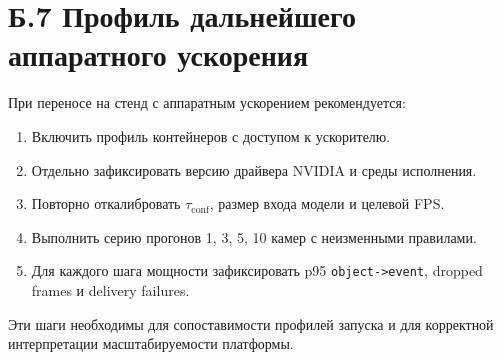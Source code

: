 \section*{Б.7 Профиль дальнейшего аппаратного ускорения}
{}

При переносе на стенд с аппаратным ускорением рекомендуется:
\begin{enumerate}
    \item Включить профиль контейнеров с доступом к ускорителю.
    \item Отдельно зафиксировать версию драйвера NVIDIA и среды исполнения.
    \item Повторно откалибровать \(\tau_{\text{conf}}\), размер входа модели и целевой FPS.
    \item Выполнить серию прогонов 1, 3, 5, 10 камер с неизменными правилами.
    \item Для каждого шага мощности зафиксировать p95 \texttt{object->event}, dropped frames и delivery failures.
\end{enumerate}

Эти шаги необходимы для сопоставимости профилей запуска и для корректной интерпретации масштабируемости платформы.
